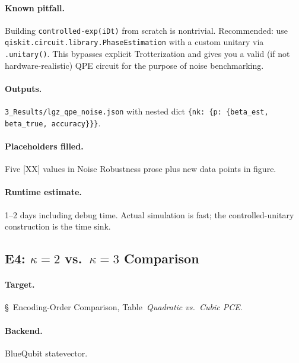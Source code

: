 \documentclass[11pt]{article}
\begin{document}
\paragraph*{Known pitfall.} Building
\texttt{controlled-exp(iDt)} from scratch is nontrivial.
Recommended: use \texttt{qiskit.circuit.library.PhaseEstimation}
with a custom unitary via \texttt{.unitary()}. This bypasses explicit
Trotterization and gives you a valid (if not hardware-realistic) QPE
circuit for the purpose of noise benchmarking.

\paragraph*{Outputs.}
\texttt{3\_Results/lgz\_qpe\_noise.json} with nested dict
\texttt{\{nk: \{p: \{beta\_est, beta\_true, accuracy\}\}\}}.

\paragraph*{Placeholders filled.} Five [XX] values in Noise
Robustness prose plus new data points in figure.

\paragraph*{Runtime estimate.} 1--2 days including debug time.
Actual simulation is fast; the controlled-unitary construction is
the time sink.

\subsection{E4: $\kappa=2$ vs.\ $\kappa=3$ Comparison}

\paragraph*{Target.} \S~Encoding-Order Comparison,
Table~\emph{Quadratic vs.\ Cubic PCE}.

\paragraph*{Backend.} BlueQubit statevector.
\end{document}

